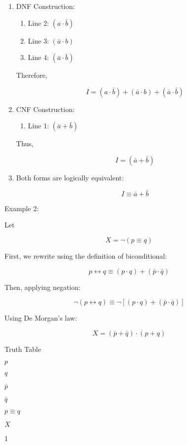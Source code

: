 \begin{enumerate}
\def\labelenumi{\arabic{enumi}.}
\item
  DNF Construction:

  \begin{enumerate}
  \def\labelenumii{\arabic{enumii}.}
  \tightlist
  \item
    Line 2: \((a \cdot \bar b)\)
  \item
    Line 3: \((\bar a \cdot b)\)
  \item
    Line 4: \((\bar a \cdot \bar b)\)
  \end{enumerate}

  Therefore,

  \[I= (a \cdot \bar b) + (\bar a \cdot b) + (\bar a \cdot \bar b)\]
\item
  CNF Construction:

  \begin{enumerate}
  \def\labelenumii{\arabic{enumii}.}
  \tightlist
  \item
    Line 1: \((\bar a + \bar b)\)
  \end{enumerate}

  Thus,

  \[I= (\bar a + \bar b)\]
\item
  Both forms are logically equivalent:

  \[I \equiv \bar a + \bar b\]
\end{enumerate}

Example 2:

Let

\[X = \neg(p \equiv q)\]

First, we rewrite using the definition of biconditional:

\[p \leftrightarrow q \equiv (p \cdot q) + (\bar{p} \cdot \bar{q})\]

Then, applying negation:

\[
\neg(p \leftrightarrow q) \equiv \neg[(p \cdot q) + (\bar{p} \cdot \bar{q})]
\]

Using De Morgan's law:

\[
X = (\bar{p} + \bar{q}) \cdot (p + q)
\]

Truth Table

\(p\)

\(q\)

\(\bar p\)

\(\bar q\)

\(p \equiv q\)

\(X\)

1

